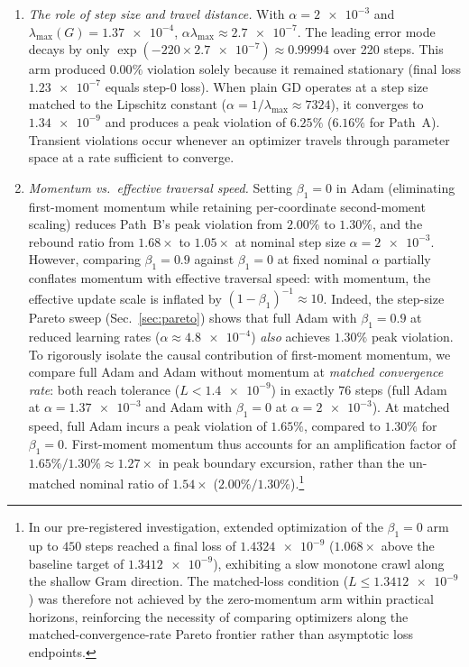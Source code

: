 \documentclass[preprint,aps,prb,longbibliography,superscriptaddress]{revtex4-2}
\begin{document}
\begin{enumerate}
  \item \textit{The role of step size and travel distance.}
    With $\alpha = \num{2e-3}$ and $\lambda_{\max}(G) = \num{1.37e-4}$,
    $\alpha\lambda_{\max} \approx \num{2.7e-7}$. The leading error mode decays
    by only $\exp(-220 \times \num{2.7e-7}) \approx 0.99994$ over 220 steps.
    This arm produced $0.00\%$ violation solely because it remained stationary
    (final loss $\num{1.23e-7}$ equals step-0 loss).
    When plain GD operates at a step size matched to the Lipschitz constant
    ($\alpha = 1/\lambda_{\max} \approx 7324$), it converges to $\num{1.34e-9}$
    and produces a peak violation of $6.25\%$ ($6.16\%$ for Path~A). Transient violations occur
    whenever an optimizer travels through parameter space at a rate sufficient
    to converge.
  \item \textit{Momentum vs.\ effective traversal speed.}
    Setting $\beta_1 = 0$ in Adam (eliminating first-moment momentum while
    retaining per-coordinate second-moment scaling) reduces Path~B's peak
    violation from $2.00\%$ to $1.30\%$, and the rebound ratio from $1.68\times$
    to $1.05\times$ at nominal step size $\alpha = \num{2e-3}$.
    However, comparing $\beta_1 = 0.9$ against $\beta_1 = 0$ at fixed nominal $\alpha$
    partially conflates momentum with effective traversal speed: with momentum, the
    effective update scale is inflated by $(1-\beta_1)^{-1} \approx 10$.
    Indeed, the step-size Pareto sweep (Sec.~\ref{sec:pareto}) shows that full Adam
    with $\beta_1 = 0.9$ at reduced learning rates ($\alpha \approx \num{4.8e-4}$)
    \emph{also} achieves $1.30\%$ peak violation.
    To rigorously isolate the causal contribution of first-moment momentum, we compare
    full Adam and Adam without momentum at \emph{matched convergence rate}:
    both reach tolerance ($L < \num{1.4e-9}$) in exactly $76$ steps (full Adam at
    $\alpha = \num{1.37e-3}$ and Adam with $\beta_1 = 0$ at $\alpha = \num{2e-3}$).
    At matched speed, full Adam incurs a peak violation of $1.65\%$, compared to
    $1.30\%$ for $\beta_1 = 0$. First-moment momentum thus accounts for an
    amplification factor of $1.65\% / 1.30\% \approx 1.27\times$ in peak boundary
    excursion, rather than the un-matched nominal ratio of $1.54\times$ ($2.00\% / 1.30\%$).\footnote{In our pre-registered investigation, extended optimization of the $\beta_1 = 0$ arm up to $450$ steps reached a final loss of $\num{1.4324e-9}$ ($1.068\times$ above the baseline target of $\num{1.3412e-9}$), exhibiting a slow monotone crawl along the shallow Gram direction. The matched-loss condition ($L \le \num{1.3412e-9}$) was therefore not achieved by the zero-momentum arm within practical horizons, reinforcing the necessity of comparing optimizers along the matched-convergence-rate Pareto frontier rather than asymptotic loss endpoints.}

\end{enumerate}
\end{document}
